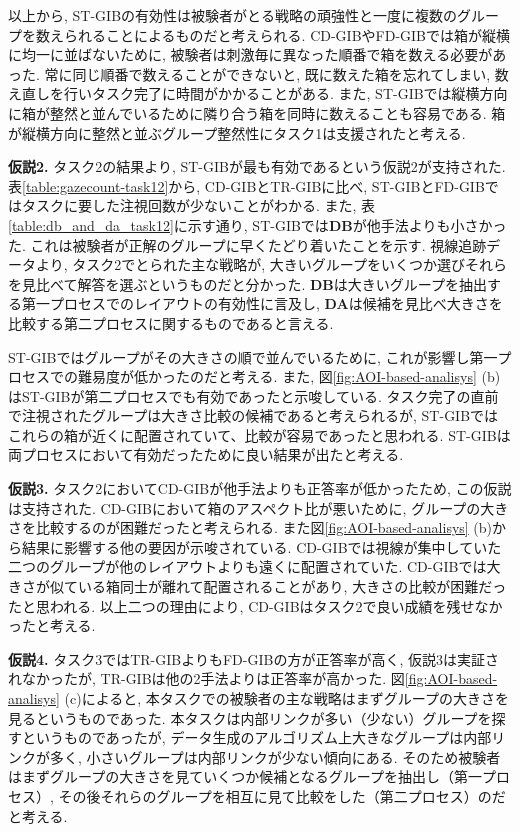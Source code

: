 \documentclass{kuee}
\begin{document}
以上から, ST-GIBの有効性は被験者がとる戦略の頑強性と一度に複数のグループを数えられることによるものだと考えられる.
CD-GIBやFD-GIBでは箱が縦横に均一に並ばないために, 被験者は刺激毎に異なった順番で箱を数える必要があった.
常に同じ順番で数えることができないと, 既に数えた箱を忘れてしまい, 数え直しを行いタスク完了に時間がかかることがある.
また, ST-GIBでは縦横方向に箱が整然と並んでいるために隣り合う箱を同時に数えることも容易である.
箱が縦横方向に整然と並ぶグループ整然性にタスク1は支援されたと考える.

{\bf 仮説2.} タスク2の結果より, ST-GIBが最も有効であるという仮説2が支持された.
表\ref{table:gazecount-task12}から, CD-GIBとTR-GIBに比べ, ST-GIBとFD-GIBではタスクに要した注視回数が少ないことがわかる.
また, 表\ref{table:db_and_da_task12}に示す通り, ST-GIBでは{\bf DB}が他手法よりも小さかった.
これは被験者が正解のグループに早くたどり着いたことを示す.
視線追跡データより, タスク2でとられた主な戦略が, 大きいグループをいくつか選びそれらを見比べて解答を選ぶというものだと分かった.
{\bf DB}は大きいグループを抽出する第一プロセスでのレイアウトの有効性に言及し, {\bf DA}は候補を見比べ大きさを比較する第二プロセスに関するものであると言える.

ST-GIBではグループがその大きさの順で並んでいるために, これが影響し第一プロセスでの難易度が低かったのだと考える.
また, 図\ref{fig:AOI-based-analisys} (b)はST-GIBが第二プロセスでも有効であったと示唆している.
タスク完了の直前で注視されたグループは大きさ比較の候補であると考えられるが, ST-GIBではこれらの箱が近くに配置されていて、比較が容易であったと思われる.
ST-GIBは両プロセスにおいて有効だったために良い結果が出たと考える.

{\bf 仮説3.} タスク2においてCD-GIBが他手法よりも正答率が低かったため, この仮説は支持された.
CD-GIBにおいて箱のアスペクト比が悪いために, グループの大きさを比較するのが困難だったと考えられる.
また図\ref{fig:AOI-based-analisys} (b)から結果に影響する他の要因が示唆されている.
CD-GIBでは視線が集中していた二つのグループが他のレイアウトよりも遠くに配置されていた.
CD-GIBでは大きさが似ている箱同士が離れて配置されることがあり, 大きさの比較が困難だったと思われる.
以上二つの理由により, CD-GIBはタスク2で良い成績を残せなかったと考える.

{\bf 仮説4.} タスク3ではTR-GIBよりもFD-GIBの方が正答率が高く, 仮説3は実証されなかったが, TR-GIBは他の2手法よりは正答率が高かった.
図\ref{fig:AOI-based-analisys} (c)によると, 本タスクでの被験者の主な戦略はまずグループの大きさを見るというものであった.
本タスクは内部リンクが多い（少ない）グループを探すというものであったが, データ生成のアルゴリズム上大きなグループは内部リンクが多く, 小さいグループは内部リンクが少ない傾向にある.
そのため被験者はまずグループの大きさを見ていくつか候補となるグループを抽出し（第一プロセス）, その後それらのグループを相互に見て比較をした（第二プロセス）のだと考える.
\end{document}
